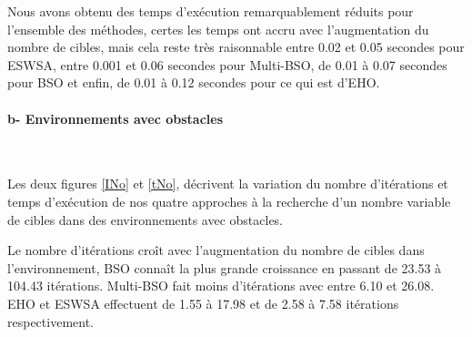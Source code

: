 	Nous avons obtenu des temps d'exécution remarquablement réduits pour l'ensemble des méthodes, certes les temps ont accru avec l'augmentation du nombre de cibles, mais cela reste très raisonnable entre 0.02 et 0.05 secondes pour ESWSA, entre 0.001 et 0.06 secondes pour Multi-BSO, de 0.01 à 0.07 secondes pour BSO et enfin, de 0.01 à 0.12 secondes pour ce qui est d'EHO.
	
	
	
	
	\noindent
	\begin{minipage}[t]{0.55\textwidth}
		\captionsetup{width=0.8\linewidth}
		\centering{}
		\label{IN}
	\end{minipage}\hfill
	\hspace{-0.5cm}
	\begin{minipage}[t]{0.55\textwidth}
		\captionsetup{width=0.8\linewidth}
		\centering{}
		\label{tN}
	\end{minipage}\hfill
	
	
	
	\paragraph{b- Environnements avec obstacles}
	\textbf{ }\\
	\noindent
	
	Les deux figures \ref{INo} et \ref{tNo}, décrivent la variation du nombre d'itérations et temps d'exécution de nos quatre approches à la recherche d'un nombre variable de cibles dans des environnements avec obstacles.\\
	\vspace{-0.2cm}
	
	Le nombre d'itérations croît avec l'augmentation du nombre de cibles dans l'environnement, BSO connaît la plus grande croissance en passant de 23.53 à 104.43 itérations. Multi-BSO fait moins d'itérations avec entre 6.10 et 26.08. EHO et ESWSA effectuent de 1.55 à 17.98 et de 2.58 à 7.58 itérations respectivement.\\
	\vspace{-0.2cm}
	
